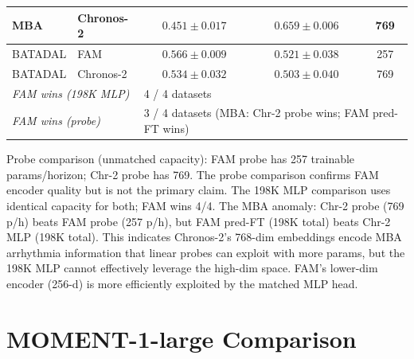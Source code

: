 \documentclass{article}
\begin{document}
\begin{table}[h]
\begin{tabular}{llccc}
    MBA                                              & Chronos-2                                                                    & $0.451 \pm 0.017$          & $\mathbf{0.659 \pm 0.006}$ & 769                  \\
    \midrule
    BATADAL                                          & FAM                                                                          & $\mathbf{0.566 \pm 0.009}$ & $0.521 \pm 0.038$          & 257                  \\
    BATADAL                                          & Chronos-2                                                                    & $0.534 \pm 0.032$          & $0.503 \pm 0.040$          & 769                  \\
    \midrule
    \multicolumn{2}{l}{\textit{FAM wins (198K MLP)}} & \multicolumn{3}{l}{4 / 4 datasets}                                                                                                                            \\
    \multicolumn{2}{l}{\textit{FAM wins (probe)}}    & \multicolumn{3}{l}{3 / 4 datasets (MBA: Chr-2 probe wins; FAM pred-FT wins)}                                                                                  \\
    \bottomrule
  \end{tabular}
  \vspace{2pt}
  \begin{minipage}{\linewidth}
    \scriptsize
    Probe comparison (unmatched capacity): FAM probe has 257 trainable params/horizon; Chr-2 probe has 769. The probe comparison confirms FAM encoder quality but is not the primary claim. The 198K MLP comparison uses identical capacity for both; FAM wins 4/4. The MBA anomaly: Chr-2 probe (769 p/h) beats FAM probe (257 p/h), but FAM pred-FT (198K total) beats Chr-2 MLP (198K total). This indicates Chronos-2's 768-dim embeddings encode MBA arrhythmia information that linear probes can exploit with more params, but the 198K MLP cannot effectively leverage the high-dim space. FAM's lower-dim encoder (256-d) is more efficiently exploited by the matched MLP head.
  \end{minipage}
\end{table}

\section{MOMENT-1-large Comparison}
\label{app:moment_full}
\end{document}

